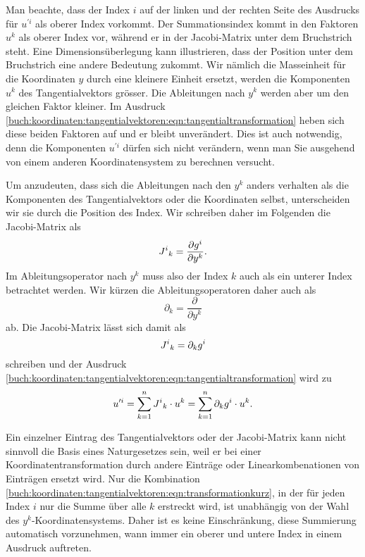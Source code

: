 Man beachte, dass der Index $i$ auf der linken und der rechten 
Seite des Ausdrucks für $u^{\prime i}$ als oberer Index vorkommt.
Der Summationsindex kommt in den Faktoren $u^k$ als oberer Index
vor, während er in der Jacobi-Matrix unter dem Bruchstrich steht.
Eine Dimensionsüberlegung kann illustrieren, dass der Position unter
dem Bruchstrich eine andere Bedeutung zukommt.
Wir nämlich die Masseinheit für die Koordinaten $y$ durch eine kleinere
Einheit ersetzt, werden die Komponenten $u^k$ des Tangentialvektors
grösser.
Die Ableitungen nach $y^k$ werden aber um den gleichen Faktor kleiner.
Im Ausdruck 
\eqref{buch:koordinaten:tangentialvektoren:eqn:tangentialtransformation}
heben sich diese beiden Faktoren auf und er bleibt unverändert.
Dies ist auch notwendig, denn die Komponenten $u^{\prime i}$ dürfen
sich nicht verändern, wenn man Sie ausgehend von einem anderen
Koordinatensystem zu berechnen versucht.

Um anzudeuten, dass sich die Ableitungen nach den $y^k$ anders verhalten
als die Komponenten des Tangentialvektors oder die Koordinaten selbst,
unterscheiden wir sie durch die Position des Index.
Wir schreiben daher im Folgenden die Jacobi-Matrix als
\[
J^i\mathstrut_k
=
\frac{\partial g^i}{\partial y^k}.
\]
Im Ableitungsoperator nach $y^k$ muss also der Index $k$ auch als ein 
unterer Index betrachtet werden.
Wir kürzen die Ableitungsoperatoren daher auch als
\[
\partial_k = \frac{\partial}{\partial y^k}
\]
ab.
Die Jacobi-Matrix lässt sich damit als
\[
J^i\mathstrut_k = \partial_k g^i
\]
schreiben und der Ausdruck
\eqref{buch:koordinaten:tangentialvektoren:eqn:tangentialtransformation}
wird zu
\begin{equation}
u^{\prime i}
=
\sum_{k=1}^n J^i\mathstrut_k \cdot u^k
=
\sum_{k=1}^n \partial_kg^i\cdot u^k.
\label{buch:koordinaten:tangentialvektoren:eqn:transformationkurz}
\end{equation}

Ein einzelner Eintrag des Tangentialvektors oder der Jacobi-Matrix
kann nicht sinnvoll die Basis eines Naturgesetzes sein, weil er bei
einer Koordinatentransformation durch andere Einträge oder Linearkombenationen
von Einträgen ersetzt wird.
Nur die Kombination
\eqref{buch:koordinaten:tangentialvektoren:eqn:transformationkurz},
in der für jeden Index $i$ nur die Summe über alle $k$ erstreckt
wird, ist unabhängig von der Wahl des $y^k$-Koordinatensystems.
Daher ist es keine Einschränkung, diese Summierung automatisch
vorzunehmen, wann immer ein oberer und untere Index in einem Ausdruck
auftreten.

